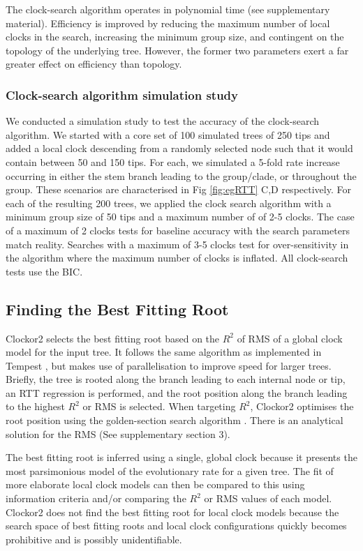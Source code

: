 \documentclass{article}
\begin{document}
The clock-search algorithm operates in polynomial time (see supplementary material). Efficiency is improved by reducing the maximum number of local clocks in the search, increasing the minimum group size, and contingent on the topology of the underlying tree. However, the former two parameters exert a far greater effect on efficiency than topology.

\subsubsection*{Clock-search algorithm simulation study}
We conducted a simulation study to test the accuracy of the clock-search algorithm. We started with a core set of 100 simulated trees of 250 tips and added a local clock descending from a randomly selected node such that it would contain between 50 and 150 tips. For each, we simulated a 5-fold rate increase occurring in either the stem branch leading to the group/clade, or throughout the group. These scenarios are characterised in  Fig \ref{fig:egRTT} C,D respectively. For each of the resulting 200 trees, we applied the clock search algorithm with a minimum group size of 50 tips and a maximum number of of 2-5 clocks. The case of a maximum of 2 clocks tests for baseline accuracy with the search parameters match reality. Searches with a maximum of 3-5 clocks test for over-sensitivity in the algorithm where the maximum number of clocks is inflated. All clock-search tests use the BIC.

\subsection*{Finding the Best Fitting Root}
Clockor2 selects the best fitting root based on the $R^2$ of RMS of a global clock model for the input tree. It follows the same algorithm as implemented in Tempest \citep{rambaut_exploring_2016}, but makes use of parallelisation to improve speed for larger trees. Briefly, the tree is rooted along the branch leading to each internal node or tip, an RTT regression is performed, and the root position along the branch leading to the highest $R^2$ or RMS is selected. When targeting $R^2$, Clockor2 optimises the root position using the golden-section search algorithm \citep{kiefer_sequential}. There is an analytical solution for the RMS (See supplementary section 3).

The best fitting root is inferred using a single, global clock because it presents the most parsimonious model of the evolutionary rate for a given tree. The fit of more elaborate local clock models can then be compared to this using information criteria and/or comparing the $R^2$ or RMS
values of each model. Clockor2 does not find the best fitting root for local clock models because the search space of best fitting roots and local clock configurations quickly becomes prohibitive and is possibly unidentifiable.
\end{document}
